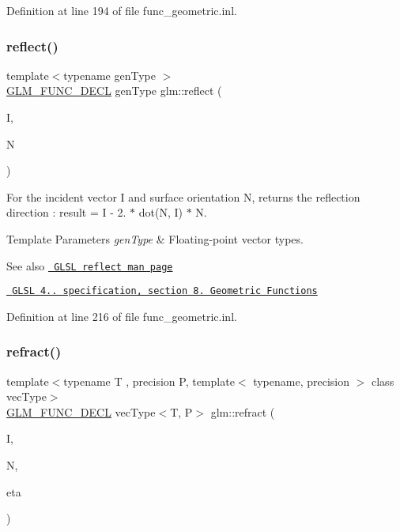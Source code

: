 Definition at line 194 of file func\+\_\+geometric.\+inl.

\mbox{\label{group__core__func__geometric_gab63646fc36b81cf69d3ce123a72f76f2}} 
\subsubsection{\texorpdfstring{reflect()}{reflect()}}
{\footnotesize\ttfamily template$<$typename gen\+Type $>$ \\
\mbox{\hyperlink{setup_8hpp_ab2d052de21a70539923e9bcbf6e83a51}{G\+L\+M\+\_\+\+F\+U\+N\+C\+\_\+\+D\+E\+CL}} gen\+Type glm\+::reflect (\begin{DoxyParamCaption}\item[{gen\+Type const \&}]{I,  }\item[{gen\+Type const \&}]{N }\end{DoxyParamCaption})}

For the incident vector I and surface orientation N, returns the reflection direction \+: result = I -\/ 2. $\ast$ dot(\+N, I) $\ast$ N.


\begin{DoxyTemplParams}{Template Parameters}
{\em gen\+Type} & Floating-\/point vector types.\\
\hline
\end{DoxyTemplParams}
\begin{DoxySeeAlso}{See also}
\href{http://www.opengl.org/sdk/docs/manglsl/xhtml/reflect.xml}{\texttt{ G\+L\+SL reflect man page}} 

\href{http://www.opengl.org/registry/doc/GLSLangSpec.4.20.8.pdf}{\texttt{ G\+L\+SL 4.. specification, section 8. Geometric Functions}} 
\end{DoxySeeAlso}


Definition at line 216 of file func\+\_\+geometric.\+inl.

\mbox{\label{group__core__func__geometric_gab7e7cdf4403931a5f7b74560ad64159b}} 
\subsubsection{\texorpdfstring{refract()}{refract()}}
{\footnotesize\ttfamily template$<$typename T , precision P, template$<$ typename, precision $>$ class vec\+Type$>$ \\
\mbox{\hyperlink{setup_8hpp_ab2d052de21a70539923e9bcbf6e83a51}{G\+L\+M\+\_\+\+F\+U\+N\+C\+\_\+\+D\+E\+CL}} vec\+Type$<$T, P$>$ glm\+::refract (\begin{DoxyParamCaption}\item[{vec\+Type$<$ T, P $>$ const \&}]{I,  }\item[{vec\+Type$<$ T, P $>$ const \&}]{N,  }\item[{T}]{eta }\end{DoxyParamCaption})}

